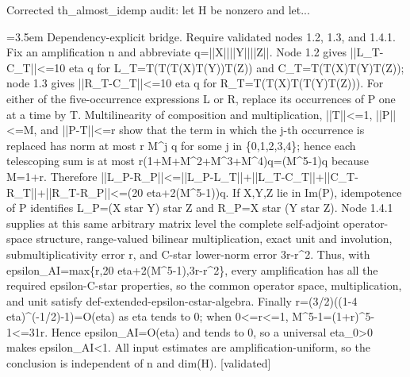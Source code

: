\documentclass{article}
\newcommand{\step}[1]{\par\noindent\hangindent=3.5em\hangafter=1%
  \makebox[3.5em][l]{\textbf{#1.}}}
\newcommand{\steptag}[1]{\hfill{\small\textsf{[#1]}}}
\begin{document}
\begin{proofbox}{Corrected th\_almost\_idemp audit: let H be nonzero and let...}
\step{1.4.2.1} Dependency-explicit bridge. Require validated nodes 1.2, 1.3, and 1.4.1. Fix an amplification n and abbreviate q=||X||||Y||||Z||. Node 1.2 gives ||L\_T-C\_T||<=10 eta q for L\_T=T(T(T(X)T(Y))T(Z)) and C\_T=T(T(X)T(Y)T(Z)); node 1.3 gives ||R\_T-C\_T||<=10 eta q for R\_T=T(T(X)T(T(Y)T(Z))). For either of the five-occurrence expressions L or R, replace its occurrences of P one at a time by T. Multilinearity of composition and multiplication, ||T||<=1, ||P||<=M, and ||P-T||<=r show that the term in which the j-th occurrence is replaced has norm at most r M\textasciicircum{}j q for some j in \{0,1,2,3,4\}; hence each telescoping sum is at most r(1+M+M\textasciicircum{}2+M\textasciicircum{}3+M\textasciicircum{}4)q=(M\textasciicircum{}5-1)q because M=1+r. Therefore ||L\_P-R\_P||<=||L\_P-L\_T||+||L\_T-C\_T||+||C\_T-R\_T||+||R\_T-R\_P||<=(20 eta+2(M\textasciicircum{}5-1))q. If X,Y,Z lie in Im(P), idempotence of P identifies L\_P=(X star Y) star Z and R\_P=X star (Y star Z). Node 1.4.1 supplies at this same arbitrary matrix level the complete self-adjoint operator-space structure, range-valued bilinear multiplication, exact unit and involution, submultiplicativity error r, and C-star lower-norm error 3r-r\textasciicircum{}2. Thus, with epsilon\_AI=max\{r,20 eta+2(M\textasciicircum{}5-1),3r-r\textasciicircum{}2\}, every amplification has all the required epsilon-C-star properties, so the common operator space, multiplication, and unit satisfy def-extended-epsilon-cstar-algebra. Finally r=(3/2)((1-4 eta)\textasciicircum{}(-1/2)-1)=O(eta) as eta tends to 0; when 0<=r<=1, M\textasciicircum{}5-1=(1+r)\textasciicircum{}5-1<=31r. Hence epsilon\_AI=O(eta) and tends to 0, so a universal eta\_0>0 makes epsilon\_AI<1. All input estimates are amplification-uniform, so the conclusion is independent of n and dim(H). \steptag{validated} \\[4pt]
\end{proofbox}
\end{document}
